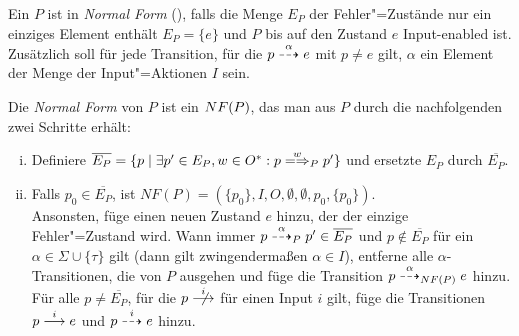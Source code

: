 \begin{Def}
  \label{NFDef}
  Ein \MEIO{} $P$ ist in \emph{Normal Form} (\NF{}), falls die Menge $E_P$ der
  Fehler"=Zustände nur ein einziges Element enthält $E_P=\{e\}$ und $P$ bis auf
  den Zustand $e$ Input-enabled ist. Zusätzlich soll für jede Transition, für
  die $p \may[\alpha] e$ mit $p\neq e$ gilt, $\alpha$ ein Element der Menge der
  Input"=Aktionen $I$ sein.

  Die \emph{Normal Form} von $P$ ist ein \MEIO{} $NF (P)$, das man aus $P$
  durch die nachfolgenden zwei Schritte erhält:
  \begin{enumerate}[(i)]
    \item Definiere $\overline{E_P} = \{p \mid \exists p'\in E_P, w\in O^*:
      p\weakmay[w]_P p'\}$ und ersetzte $E_P$ durch $\overline{E_P}$.
    \item Falls $p_0\in \overline{E_P}$, ist $NF(P) = (\{p_0\}, I, O, \emptyset
      , \emptyset , p_0, \{p_0\})$.\\
      Ansonsten, füge einen neuen Zustand $e$ hinzu, der der einzige
      Fehler"=Zustand wird. Wann immer $p \may[\alpha]_P p'\in \overline{E_P}$
      und $p\notin \overline{E_P}$ für ein $\alpha\in \Sigma \cup \{\tau\}$
      gilt (dann gilt zwingendermaßen $\alpha \in I$), entferne alle
      $\alpha$-Transitionen, die von $P$ ausgehen und füge die Transition
      $p\may[\alpha]_{\NF (P)} e$ hinzu. Für alle $p\neq \overline{E_P}$, für
      die $p \nmust[i]$ für einen Input $i$ gilt, füge die Transitionen $p
      \must[i] e$ und $p \may[i] e$ hinzu.
  \end{enumerate}
\end{Def}

